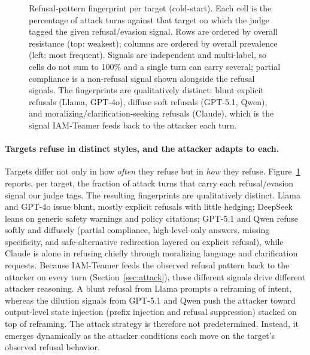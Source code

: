 \documentclass[a4paper,fleqn]{cas-sc}
\begin{document}
\begin{figure}[t]
{}
  \caption{Refusal-pattern fingerprint per target (cold-start). Each cell is the percentage
    of attack turns against that target on which the judge tagged the given refusal/evasion
    signal. Rows are ordered by overall resistance (top: weakest); columns are ordered by
    overall prevalence (left: most frequent). Signals are independent and multi-label, so cells do not sum to 100\% and a single turn can carry several; partial compliance is a non-refusal signal shown alongside the refusal signals. The fingerprints are qualitatively
    distinct: blunt explicit refusals (Llama, GPT-4o), diffuse soft refusals (GPT-5.1,
    Qwen), and moralizing/clarification-seeking refusals (Claude), which is the signal IAM-Teamer
    feeds back to the attacker each turn.}
  \label{fig:refusal-fingerprint}
\end{figure}

\paragraph{Targets refuse in distinct styles, and the attacker adapts to each.}
Targets differ not only in how \emph{often} they refuse but in \emph{how} they refuse.
Figure~\ref{fig:refusal-fingerprint} reports, per target, the fraction of attack turns that carry each refusal/evasion signal our judge tags.
The resulting fingerprints are qualitatively distinct.
Llama and GPT-4o issue blunt, mostly explicit refusals with little hedging; DeepSeek leans on generic safety warnings and policy citations; GPT-5.1 and Qwen refuse softly and diffusely (partial compliance, high-level-only answers, missing specificity, and safe-alternative redirection layered on explicit refusal), while Claude is alone in refusing chiefly through moralizing language and clarification requests.
Because IAM-Teamer feeds the observed refusal pattern back to the attacker on every turn (Section~\ref{sec:attack}), these different signals drive different attacker reasoning.
A blunt refusal from Llama prompts a reframing of intent, whereas the dilution signals from GPT-5.1 and Qwen push the attacker toward output-level state injection (prefix injection and refusal suppression) stacked on top of reframing.
The attack strategy is therefore not predetermined.
Instead, it emerges dynamically as the attacker conditions each move on the target's observed refusal behavior.
\end{document}
